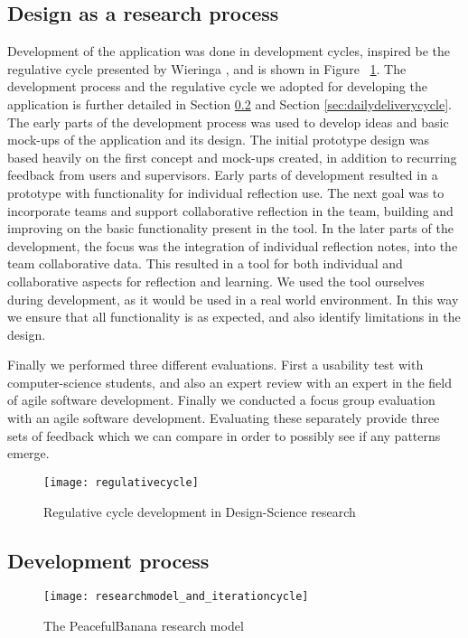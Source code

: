 \subsection{Design as a research process}
Development of the application was done in development cycles, inspired be the regulative cycle presented by Wieringa \citep{wieringa}, and is shown in Figure ~\ref{regulativecycle}. The development process and the regulative cycle we adopted for developing the application is further detailed in Section \ref{subsec:devprocess} and Section \ref{sec:dailydeliverycycle}.
The early parts of the development process was used to develop ideas and basic mock-ups of the application and its design. The initial prototype design was based heavily on the first concept and mock-ups created, in addition to recurring feedback from users and supervisors. Early parts of development resulted in a prototype with functionality for individual reflection use. The next goal was to incorporate teams and support collaborative reflection in the team, building and improving on the basic functionality present in the tool. In the later parts of the development, the focus was the integration of individual reflection notes, into the team collaborative data. This resulted in a tool for both individual and collaborative aspects for reflection and learning. We used the tool ourselves during development, as it would be used in a real world environment. In this way we ensure that all functionality is as expected, and also identify limitations in the design. 

Finally we performed three different evaluations. First a usability test with computer-science students, and also an expert review with an expert in the field of agile software development. Finally we conducted a focus group evaluation with an agile software development. Evaluating these separately provide three sets of feedback which we can compare in order to possibly see if any patterns emerge. \\

\begin{figure}[!htpb]
\centering
	\texttt{[image: regulativecycle]}
\caption{Regulative cycle development in Design-Science research \citep{wieringa}}
\label{regulativecycle}
\end{figure}

\subsection{Development process}
\label{subsec:devprocess}
\begin{figure}[!htpb]
\centering
	\texttt{[image: researchmodel\_and\_iterationcycle]}
\caption{The PeacefulBanana research model }
\label{researchmodel}
\end{figure}

